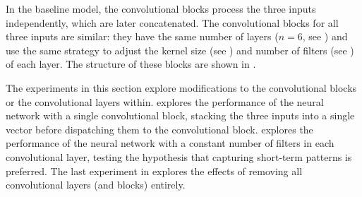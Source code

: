 
In the baseline model, the convolutional blocks process the
three inputs independently, which are later concatenated.
The convolutional blocks for all three inputs are similar:
they have the same number of layers ($n=6$, see
) and use the
same strategy to adjust the kernel size (see
) and number of filters (see
) of each layer. The structure
of these blocks are shown in
. 


The experiments in this section explore modifications to the
convolutional blocks or the convolutional layers within.
 explores the
performance of the neural network with a single
convolutional block, stacking the three inputs into a single
vector before dispatching them to the convolutional block.
 explores the
performance of the neural network with a constant number of
filters in each convolutional layer, testing the hypothesis
that capturing short-term patterns is preferred. The last
experiment in  explores
the effects of removing all convolutional layers (and
blocks) entirely.
